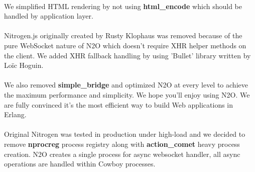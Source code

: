 \paragraph{}
We simplified HTML rendering by not using
{\bf html\_encode} which should be handled by application layer.

\paragraph{}
Nitrogen.js originally created by Rusty Klophaus
was removed because of the pure WebSocket nature of N2O which doesn't
require XHR helper methods on the client. We added XHR fallback
handling by using 'Bullet' library written by Loïc Hoguin.

\paragraph{}
We also removed {\bf simple\_bridge} and optimized N2O at every level to
achieve the maximum performance and simplicity. We hope you'll enjoy
using N2O. We are fully convinced it's the most efficient way to
build Web applications in Erlang.

\paragraph{}
Original Nitrogen was tested in production under high-load and we
decided to remove {\bf nprocreg} process registry along 
with {\bf{action\_comet}} heavy process creation. N2O creates a single
process for async websocket handler, all async operations
are handled within Cowboy processes.
